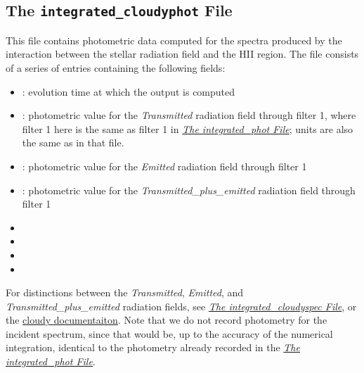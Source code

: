 \documentclass[letterpaper,10pt,english]{sphinxmanual}
\begin{document}
\subsection{The \texttt{integrated\_cloudyphot} File}
\label{cloudy:the-integrated-cloudyphot-file}
This file contains photometric data computed for the spectra produced
by the interaction between the stellar radiation field and the HII
region. The file consists of a series of entries containing the
following fields:
\begin{itemize}
\item {} 
: evolution time at which the output is computed

\item {} 
: photometric value for the \emph{Transmitted}
radiation field through filter 1, where filter 1 here is the same as
filter 1 in {\hyperref[output:ssec\string-int\string-phot\string-file]{\emph{The integrated\_phot File}}}; units are also the same as
in that file.

\item {} 
: photometric value for the \emph{Emitted}
radiation field through filter 1

\item {} 
: photometric value for the
\emph{Transmitted\_plus\_emitted} radiation field through filter 1

\item {} 

\item {} 

\item {} 

\item {} 

\end{itemize}

For distinctions between the \emph{Transmitted}, \emph{Emitted}, and
\emph{Transmitted\_plus\_emitted} radiation fields, see
{\hyperref[cloudy:sssec\string-int\string-cloudyspec\string-file]{\emph{The integrated\_cloudyspec File}}}, or the \href{http://nublado.org}{cloudy documentaiton}. Note that we do not record photometry for the
incident spectrum, since that would be, up to the accuracy of the
numerical integration, identical to the photometry already recorded in
the {\hyperref[output:ssec\string-int\string-phot\string-file]{\emph{The integrated\_phot File}}}.
\end{document}
